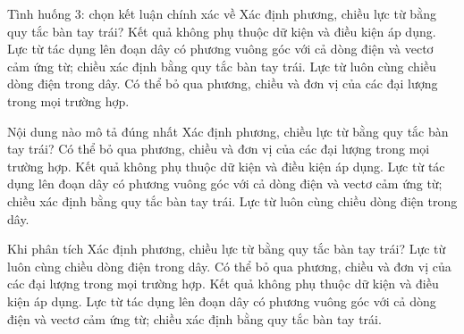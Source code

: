 \begin{ex}
Tình huống 3: chọn kết luận chính xác về Xác định phương, chiều lực từ bằng quy tắc bàn tay trái?
\choice
{Kết quả không phụ thuộc dữ kiện và điều kiện áp dụng.}
{\True Lực từ tác dụng lên đoạn dây có phương vuông góc với cả dòng điện và vectơ cảm ứng từ; chiều xác định bằng quy tắc bàn tay trái.}
{Lực từ luôn cùng chiều dòng điện trong dây.}
{Có thể bỏ qua phương, chiều và đơn vị của các đại lượng trong mọi trường hợp.}
\end{ex}

\begin{ex}
Nội dung nào mô tả đúng nhất Xác định phương, chiều lực từ bằng quy tắc bàn tay trái?
\choice
{Có thể bỏ qua phương, chiều và đơn vị của các đại lượng trong mọi trường hợp.}
{Kết quả không phụ thuộc dữ kiện và điều kiện áp dụng.}
{\True Lực từ tác dụng lên đoạn dây có phương vuông góc với cả dòng điện và vectơ cảm ứng từ; chiều xác định bằng quy tắc bàn tay trái.}
{Lực từ luôn cùng chiều dòng điện trong dây.}
\end{ex}

\begin{ex}
Khi phân tích Xác định phương, chiều lực từ bằng quy tắc bàn tay trái?
\choice
{Lực từ luôn cùng chiều dòng điện trong dây.}
{Có thể bỏ qua phương, chiều và đơn vị của các đại lượng trong mọi trường hợp.}
{Kết quả không phụ thuộc dữ kiện và điều kiện áp dụng.}
{\True Lực từ tác dụng lên đoạn dây có phương vuông góc với cả dòng điện và vectơ cảm ứng từ; chiều xác định bằng quy tắc bàn tay trái.}
\end{ex}

